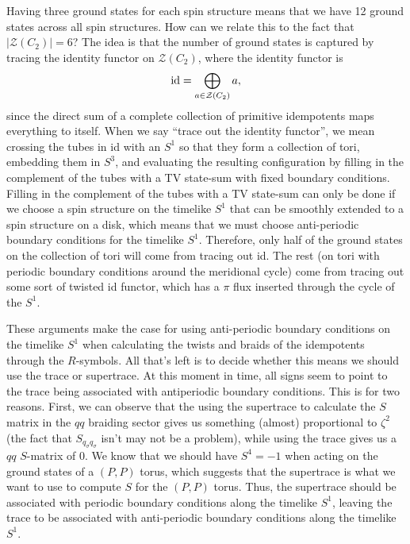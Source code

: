 \documentclass[12pt,a4paper]{article}
\newcommand{\mcz}{\mathcal{Z}}
\newcommand\be            {\begin{equation}}
\newcommand\ee            {\end{equation}}
\begin{document}
Having three ground states for each spin structure means that we have 12 ground states across all spin structures. How can we relate this to the fact that $|\mcz(C_2)| = 6$? The idea is that the number of ground states is captured by tracing the identity functor on $\mcz(C_2)$, where the identity functor is
\be {\rm id} = \bigoplus_{a\in\mcz(C_2)} a,\ee
since the direct sum of a complete collection of primitive idempotents maps everything to itself. When we say ``trace out the identity functor'', we mean crossing the tubes in id with an $S^1$ so that they form a collection of tori, embedding them in $S^3$, and evaluating the resulting configuration by filling in the complement of the tubes with a TV state-sum with fixed boundary conditions. Filling in the complement of the tubes with a TV state-sum can only be done if we choose a spin structure on the timelike $S^1$ that can be smoothly extended to a spin structure on a disk, which means that we must choose anti-periodic boundary conditions for the timelike $S^1$. Therefore, only half of the ground states on the collection of tori will come from tracing out id. The rest (on tori with periodic boundary conditions around the meridional cycle) come from tracing out some sort of twisted id functor, which has a $\pi$ flux inserted through the cycle of the $S^1$. 

These arguments make the case for using anti-periodic boundary conditions on the timelike $S^1$ when calculating the twists and braids of the idempotents through the $R$-symbols. All that's left is to decide whether this means we should use the trace or supertrace. At this moment in time, all signs seem to point to the trace being associated with antiperiodic boundary conditions. This is for two reasons. First, we can observe that the using the supertrace to calculate the $S$ matrix in the $qq$ braiding sector gives us something (almost) proportional to $\zeta^2$ (the fact that $S_{q_\sigma q_\sigma}$ isn't may not be a problem), while using the trace gives us a $qq$ $S$-matrix of $0$. We know that we should have $S^4 = -1$ when acting on the ground states of a $(P,P)$ torus, which suggests that the supertrace is what we want to use to compute $S$ for the $(P,P)$ torus. Thus, the supertrace should be associated with periodic boundary conditions along the timelike $S^1$, leaving the trace to be associated with anti-periodic boundary conditions along the timelike $S^1$. 
\end{document}
